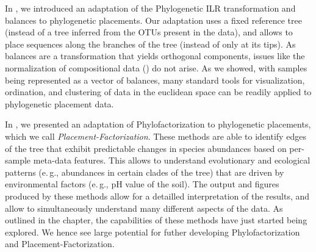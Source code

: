In , we introduced an adaptation of the Phylogenetic ILR transformation and balances \cite{Silverman2017}
to phylogenetic placements.
Our adaptation uses a fixed reference tree (instead of a tree inferred from the OTUs present in the data),
and allows to place sequences along the branches of the tree (instead of only at its tips).
As balances are a transformation that yields orthogonal components, %
issues like the normalization of compositional data
() do not arise.
As we showed, with samples being represented as a vector of balances,
many standard tools for visualization, ordination, and clustering of data in the euclidean space
can be readily applied to phylogenetic placement data.

In , we presented an adaptation of Phylofactorization \cite{Washburne2017a} to phylogenetic placements,
which we call \emph{Placement-Factorization}.
These methods are able to identify edges of the tree that exhibit predictable changes in species abundances
based on per-sample meta-data features.
This allows to understand evolutionary and ecological patterns (e.\,g., abundances in certain clades of the tree)
that are driven by environmental factors (e.\,g., pH value of the soil).
The output and figures produced by these methods allow for a detailled interpretation of the results,
and allow to simultaneously understand many different aspects of the data.
As outlined in the chapter, the capabilities of these methods have just started being explored.
We hence see large potential for futher developing Phylofactorization and Placement-Factorization.

